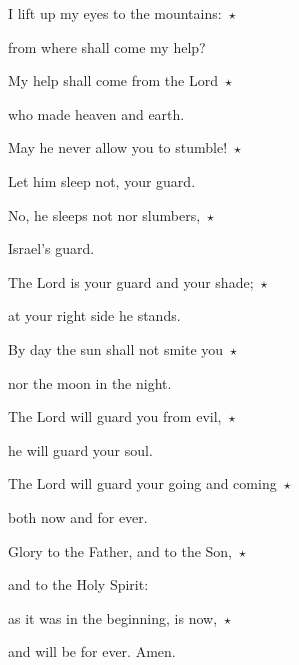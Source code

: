 \noindent I lift up my eyes to the mountains:~$\star$~\nopagebreak

from where shall come my help?

\noindent My help shall come from the Lord~$\star$~\nopagebreak

who made heaven and earth.

\noindent May he never allow you to stumble!~$\star$~\nopagebreak

Let him sleep not, your guard.

\noindent No, he sleeps not nor slumbers,~$\star$~\nopagebreak

Israel’s guard.

\noindent The Lord is your guard and your shade;~$\star$~\nopagebreak

at your right side he stands.

\noindent By day the sun shall not smite you~$\star$~\nopagebreak

nor the moon in the night.

\noindent The Lord will guard you from evil,~$\star$~\nopagebreak

he will guard your soul.

\noindent The Lord will guard your going and coming~$\star$~\nopagebreak

both now and for ever.

\noindent Glory to the Father, and to the Son,~$\star$~\nopagebreak

and to the Holy Spirit:

\noindent as it was in the beginning, is now,~$\star$~\nopagebreak

and will be for ever. Amen.
